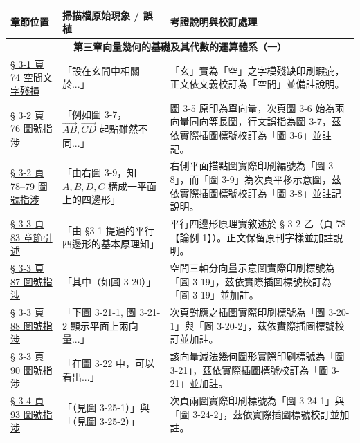 \documentclass[a4paper,12pt,twoside]{article}
\begin{document}
\begin{table}[H]
\centering
\small
\renewcommand{\arraystretch}{1.35}
\begin{tabularx}{\textwidth}{|p{3.0cm}|p{3.8cm}|X|}
\hline
\textbf{章節位置} & \textbf{掃描檔原始現象 / 誤植} & \textbf{考證說明與校訂處理} \\ \hline

\multicolumn{3}{|c|}{\textbf{第三章\quad 向量幾何的基礎及其代數的運算體系（一）}} \\ \hline

\hyperref[note:b3s-ch3-p74-space-font]{§ 3-1 頁 74 空間文字殘損} & 
「設在玄間中相關於...」 & 
「玄」實為「空」之字模殘缺印刷瑕疵，正文依文義校訂為「空間」並備註說明。 \\ \hline

\hyperref[note:b3s-ch3-p76-fig-ref]{§ 3-2 頁 76 圖號指涉} & 
「例如圖 3-7，$\vec{AB},\vec{CD}$ 起點雖然不同...」 & 
圖 3-5 原印為單向量，次頁圖 3-6 始為兩向量同向等長圖，行文誤指為圖 3-7，茲依實際插圖標號校訂為「圖 3-6」並註記。 \\ \hline

\hyperref[note:b3s-ch3-p78-fig3-9]{§ 3-2 頁 78--79 圖號指涉} & 
「由右圖 3-9，知 $A,B,D,C$ 構成一平面上的四邊形」 & 
右側平面描點圖實際印刷編號為「圖 3-8」，而「圖 3-9」為次頁平移示意圖，茲依實際插圖標號校訂為「圖 3-8」並註記說明。 \\ \hline

\hyperref[note:b3s-ch3-p83-sec-ref]{§ 3-3 頁 83 章節引述} & 
「由 §3-1 提過的平行四邊形的基本原理知」 & 
平行四邊形原理實敘述於 § 3-2 乙（頁 78【論例 1】）。正文保留原刊字樣並加註說明。 \\ \hline

\hyperref[note:b3s-ch3-p87-fig-ref]{§ 3-3 頁 87 圖號指涉} & 
「其中（如圖 3-20）」 & 
空間三軸分向量示意圖實際印刷標號為「圖 3-19」，茲依實際插圖標號校訂為「圖 3-19」並加註。 \\ \hline

\hyperref[note:b3s-ch3-p88-fig-ref]{§ 3-3 頁 88 圖號指涉} & 
「下圖 3-21-1, 圖 3-21-2 顯示平面上兩向量...」 & 
次頁對應之插圖實際印刷標號為「圖 3-20-1」與「圖 3-20-2」，茲依實際插圖標號校訂並加註。 \\ \hline

\hyperref[note:b3s-ch3-p90-fig-ref]{§ 3-3 頁 90 圖號指涉} & 
「在圖 3-22 中，可以看出...」 & 
該向量減法幾何圖形實際印刷標號為「圖 3-21」，茲依實際插圖標號校訂為「圖 3-21」並加註。 \\ \hline

\hyperref[note:b3s-ch3-p93-fig-ref]{§ 3-4 頁 93 圖號指涉} & 
「（見圖 3-25-1）」與「（見圖 3-25-2）」 & 
次頁兩圖實際印刷標號為「圖 3-24-1」與「圖 3-24-2」，茲依實際插圖標號校訂並加註。 \\ \hline


\end{tabularx}
\end{table}
\end{document}
